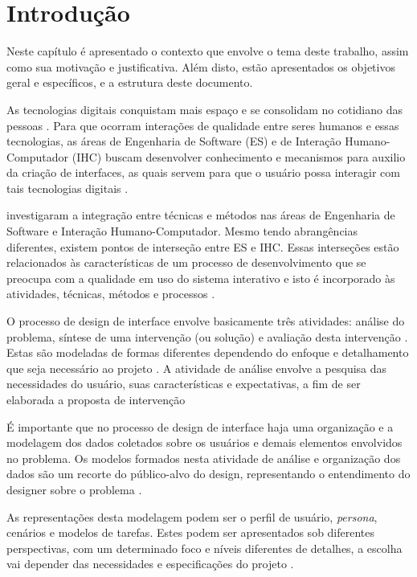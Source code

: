 \chapter{Introdução}
\label{chap:intro}

Neste capítulo é apresentado o contexto que envolve o tema deste trabalho, assim como sua motivação e justificativa. Além disto, estão apresentados os objetivos geral e específicos, e a estrutura deste documento. 

As tecnologias digitais conquistam mais espaço e se consolidam no cotidiano das pessoas \cite{Sales2020}. Para que ocorram interações de qualidade entre seres humanos e essas tecnologias, as áreas de Engenharia de Software (ES) e de Interação Humano-Computador (IHC) buscam desenvolver conhecimento e mecanismos para auxilio da criação de interfaces, as quais servem para que o usuário possa interagir com tais tecnologias digitais \cite[p. 3, 8-10]{BarbosaEtAl2021}.  

 investigaram a integração entre técnicas e métodos nas áreas de Engenharia de Software e Interação Humano-Computador. Mesmo tendo abrangências diferentes, existem pontos de interseção entre ES e IHC. Essas interseções estão relacionados às características de um processo de desenvolvimento que se preocupa com a qualidade em uso do sistema interativo e isto é incorporado às atividades, técnicas, métodos e processos \cite[p. 114-115]{BarbosaEtAl2021}.

O processo de design de interface envolve basicamente três atividades: análise do problema, síntese de uma intervenção (ou solução) e avaliação desta intervenção \cite{lawson2006}. Estas são modeladas de formas diferentes dependendo do enfoque e detalhamento que seja necessário ao projeto \cite[p. 98-99]{BarbosaEtAl2021}. A atividade de análise envolve a pesquisa das necessidades do usuário, suas características e expectativas, a fim de ser elaborada a proposta de intervenção \cite[p. 121]{BarbosaEtAl2021}

É importante que no processo de design de interface haja uma organização e a modelagem dos dados coletados sobre os usuários e demais elementos envolvidos no problema. Os modelos formados nesta atividade de análise e organização dos dados são um recorte do público-alvo do design, representando o entendimento do designer sobre o problema \cite[p. 151]{BarbosaEtAl2021}. 

As representações desta modelagem podem ser o perfil de usuário, \textit{persona}, cenários e modelos de tarefas. Estes podem ser apresentados sob diferentes perspectivas, com um determinado foco e níveis diferentes de detalhes, a escolha vai depender das necessidades e especificações do projeto \cite[p. 151]{BarbosaEtAl2021}.

